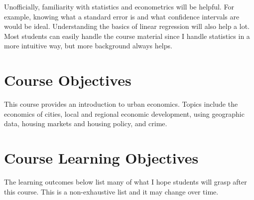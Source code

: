 \documentclass[11pt,letterpaper,final]{article}
\begin{document}
Unofficially, familiarity with statistics and econometrics will be helpful. For example, knowing what a standard error is and what confidence intervals are would be ideal. Understanding the basics of linear regression will also help a lot. Most students can easily handle the course material since I handle statistics in a more intuitive way, but more background always helps.

\section{Course Objectives} 
This course provides an introduction to urban economics. Topics include the economics of cities, local and regional economic development, using geographic data, housing markets and housing policy, and crime.

\section{Course Learning Objectives} The learning outcomes below list many of what I hope students will grasp after this course. This is a non-exhaustive list and it may change over time. 
\end{document}
